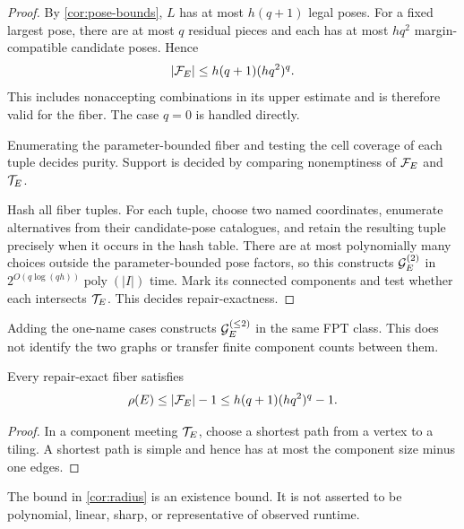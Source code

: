\begin{proof}
By \cref{cor:pose-bounds}, \(L\) has at most \(h(q+1)\) legal poses.  For a
fixed largest pose, there are at most \(q\) residual pieces and each has at
most \(hq^2\) margin-compatible candidate poses.  Hence
\[
 |\mathcal F_E|
 \leq h(q+1)(hq^2)^q.
\]
This includes nonaccepting combinations in its upper estimate and is
therefore valid for the fiber.  The case \(q=0\) is handled directly.

Enumerating the parameter-bounded fiber and testing the cell coverage of
each tuple decides purity.  Support is decided by comparing nonemptiness of
\(\mathcal F_E\) and \(\mathcal T_E\).

Hash all fiber tuples.  For each tuple, choose two named coordinates,
enumerate alternatives from their candidate-pose catalogues, and retain
the resulting tuple precisely when it occurs in the hash table.  There are
at most polynomially many choices outside the parameter-bounded pose
factors, so this constructs \(\mathcal G_E^{(2)}\) in
\(2^{O(q\log(qh))}\operatorname{poly}(|I|)\) time.  Mark its connected
components and test whether each intersects \(\mathcal T_E\).  This decides
repair-exactness.
\end{proof}

\begin{remark}
Adding the one-name cases constructs \(\mathcal G_E^{(\leq2)}\) in the same FPT
class.  This does not identify the two graphs or transfer finite component
counts between them.
\end{remark}

\begin{corollary}\label{cor:radius}
Every repair-exact fiber satisfies
\[
 \rho(E)\leq|\mathcal F_E|-1
 \leq h(q+1)(h q^2)^q-1.
\]
\end{corollary}

\begin{proof}
In a component meeting \(\mathcal T_E\), choose a shortest path from a vertex to a
tiling.  A shortest path is simple and hence has at most the component size
minus one edges.
\end{proof}

The bound in \cref{cor:radius} is an existence bound.  It is not asserted to
be polynomial, linear, sharp, or representative of observed runtime.
